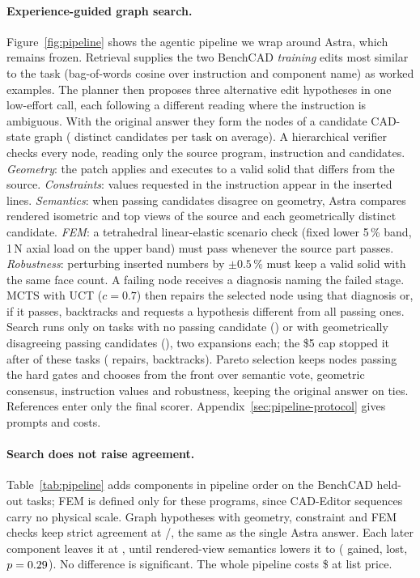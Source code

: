\paragraph{Experience-guided graph search.}
Figure~\ref{fig:pipeline} shows the agentic pipeline we wrap around Astra, which remains frozen. Retrieval supplies the two BenchCAD \emph{training} edits most similar to the task (bag-of-words cosine over instruction and component name) as worked examples. The planner then proposes three alternative edit hypotheses in one low-effort call, each following a different reading where the instruction is ambiguous. With the original answer they form the nodes of a candidate CAD-state graph (\pipeCandidates{} distinct candidates per task on average). A hierarchical verifier checks every node, reading only the source program, instruction and candidates. \emph{Geometry}: the patch applies and executes to a valid solid that differs from the source. \emph{Constraints}: values requested in the instruction appear in the inserted lines. \emph{Semantics}: when passing candidates disagree on geometry, Astra compares rendered isometric and top views of the source and each geometrically distinct candidate. \emph{FEM}: a tetrahedral linear-elastic scenario check (fixed lower 5\,\% band, 1\,N axial load on the upper band) must pass whenever the source part passes. \emph{Robustness}: perturbing inserted numbers by $\pm0.5\,\%$ must keep a valid solid with the same face count. A failing node receives a diagnosis naming the failed stage. MCTS with UCT ($c=0.7$) then repairs the selected node using that diagnosis or, if it passes, backtracks and requests a hypothesis different from all passing ones. Search runs only on tasks with no passing candidate (\pipeNoPass) or with geometrically disagreeing passing candidates (\pipeDisagree), two expansions each; the \$5 cap stopped it after \pipeExpanded{} of these \pipeEligible{} tasks (\pipeRepairs{} repairs, \pipeBacktracks{} backtracks). Pareto selection keeps nodes passing the hard gates and chooses from the front over semantic vote, geometric consensus, instruction values and robustness, keeping the original answer on ties. References enter only the final scorer. Appendix~\ref{sec:pipeline-protocol} gives prompts and costs.

\paragraph{Search does not raise agreement.}
Table~\ref{tab:pipeline} adds components in pipeline order on the \pipeN{} BenchCAD held-out tasks; FEM is defined only for these programs, since CAD-Editor sequences carry no physical scale. Graph hypotheses with geometry, constraint and FEM checks keep strict agreement at \pipeGot/\pipeN{}, the same as the single Astra answer. Each later component leaves it at \pipeMcts{}, until rendered-view semantics lowers it to \pipeFull{} (\pipeFullGain{} gained, \pipeFullLoss{} lost, $p=0.29$). No difference is significant. The whole pipeline costs \$\pipeCost{} at list price.

